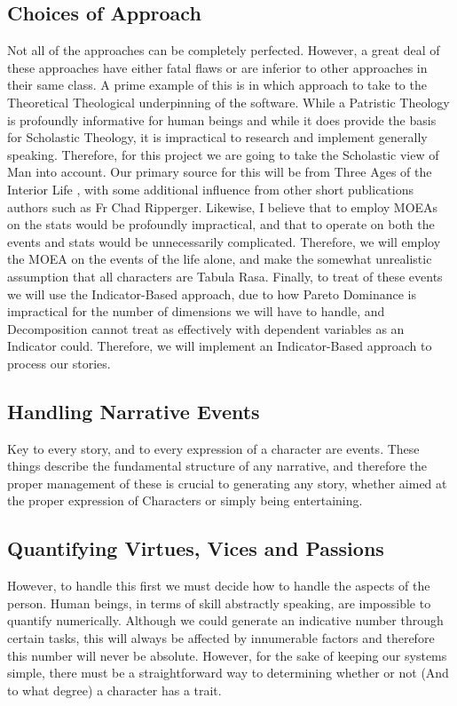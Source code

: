 \documentclass[12pt]{article}
\begin{document}
\subsection{Choices of Approach}
Not all of the approaches can be completely perfected. However, a great deal of these approaches have either fatal flaws or are inferior to other approaches in their same class. A prime example of this is in which approach to take to the Theoretical Theological underpinning of the software. While a Patristic Theology is profoundly informative for human beings and while it does provide the basis for Scholastic Theology, it is impractical to research and implement generally speaking. Therefore, for this project we are going to take the Scholastic view of Man into account. Our primary source for this will be from Three Ages of the Interior Life \cite{garrigou2013three}, with some additional influence from other short publications authors such as Fr Chad Ripperger. Likewise, I believe that to employ MOEAs on the stats would be profoundly impractical, and that to operate on both the events and stats would be unnecessarily complicated. Therefore, we will employ the MOEA on the events of the life alone, and make the somewhat unrealistic assumption that all characters are Tabula Rasa. Finally, to treat of these events we will use the Indicator-Based approach, due to how Pareto Dominance is impractical for the number of dimensions we will have to handle, and Decomposition cannot treat as effectively with dependent variables as an Indicator could. Therefore, we will implement an Indicator-Based approach to process our stories. 

\subsection{Handling Narrative Events}
Key to every story, and to every expression of a character are events. These things describe the fundamental structure of any narrative, and therefore the proper management of these is crucial to generating any story, whether aimed at the proper expression of Characters or simply being entertaining. 

\subsection{Quantifying Virtues, Vices and Passions}
However, to handle this first we must decide how to handle the aspects of the person. Human beings, in terms of skill abstractly speaking, are impossible to quantify numerically. Although we could generate an indicative number through certain tasks, this will always be affected by innumerable factors and therefore this number will never be absolute. However, for the sake of keeping our systems simple, there must be a straightforward way to determining whether or not (And to what degree) a character has a trait. \\
\end{document}
